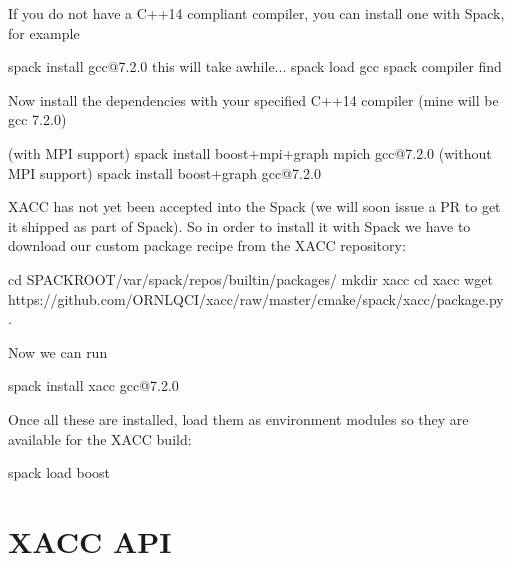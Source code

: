 \documentclass[letterpaper,10pt,english]{sphinxmanual}
\begin{document}
If you do not have a C++14 compliant compiler, you can
install one with Spack, for example

\begin{sphinxVerbatim}[commandchars=\\\{\}]
\PYGZdl{} spack install gcc@7.2.0 \PYGZsh{} this will take awhile...
\PYGZdl{} spack load gcc
\PYGZdl{} spack compiler find
\end{sphinxVerbatim}

Now install the dependencies with your specified C++14 compiler (mine
will be gcc 7.2.0)

\begin{sphinxVerbatim}[commandchars=\\\{\}]
\PYGZdl{} (with MPI support) spack install boost+mpi+graph \PYGZca{}mpich \PYGZpc{}gcc@7.2.0
\PYGZdl{} (without MPI support) spack install boost+graph \PYGZpc{}gcc@7.2.0
\end{sphinxVerbatim}

XACC has not yet been accepted into the Spack (we will soon issue a PR
to get it shipped as part of Spack). So in order to install it with Spack
we have to download our custom package recipe from the XACC repository:

\begin{sphinxVerbatim}[commandchars=\\\{\}]
\PYGZdl{} cd \PYGZdl{}SPACK\PYGZus{}ROOT/var/spack/repos/builtin/packages/ \PYGZam{}\PYGZam{} mkdir xacc
\PYGZdl{} cd xacc \PYGZam{}\PYGZam{} wget https://github.com/ORNL\PYGZhy{}QCI/xacc/raw/master/cmake/spack/xacc/package.py .
\end{sphinxVerbatim}

Now we can run

\begin{sphinxVerbatim}[commandchars=\\\{\}]
\PYGZdl{} spack install xacc \PYGZpc{}gcc@7.2.0
\end{sphinxVerbatim}

Once all these are installed, load them as environment modules
so they are available for the XACC build:

\begin{sphinxVerbatim}[commandchars=\\\{\}]
\PYGZdl{} spack load boost
\end{sphinxVerbatim}


\chapter{XACC API}
\label{\detokenize{api:xacc-api}}\label{\detokenize{api::doc}}
\end{document}
